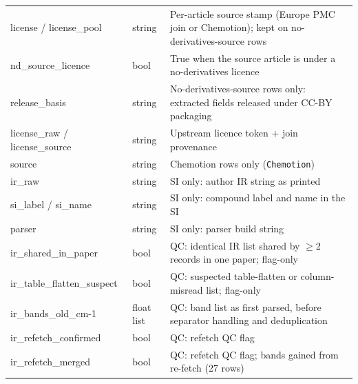 \documentclass[pdflatex,sn-nature]{sn-jnl}
\begin{document}
\begin{table}[!htbp]
\begin{tabular}{@{}>{\ttfamily\raggedright\arraybackslash}p{3.35cm}
  >{\raggedright\arraybackslash}p{1.55cm}
  >{\raggedright\arraybackslash}p{6.15cm}@{}}
license / license\_pool & string & Per-article source stamp (Europe PMC join or Chemotion); kept on no-derivatives-source rows \\
nd\_source\_licence & bool & True when the source article is under a no-derivatives licence \\
release\_basis & string & No-derivatives-source rows only: extracted fields released under CC-BY packaging \\
license\_raw / license\_source & string & Upstream licence token + join provenance \\
source & string & Chemotion rows only (\texttt{Chemotion}) \\
ir\_raw & string & SI only: author IR string as printed \\
si\_label / si\_name & string & SI only: compound label and name in the SI \\
parser & string & SI only: parser build string \\
ir\_shared\_in\_paper & bool & QC: identical IR list shared by $\geq$2 records in one paper; flag-only \\
ir\_table\_flatten\_\allowbreak suspect & bool & QC: suspected table-flatten or column-misread list; flag-only \\
ir\_bands\_old\_cm-1 & float list & QC: band list as first parsed, before separator handling and deduplication \\
ir\_refetch\_confirmed & bool & QC: refetch QC flag \\
ir\_refetch\_merged & bool & QC: refetch QC flag; bands gained from re-fetch (27 rows) \\
\bottomrule
\end{tabular}
\end{table}
\end{document}
